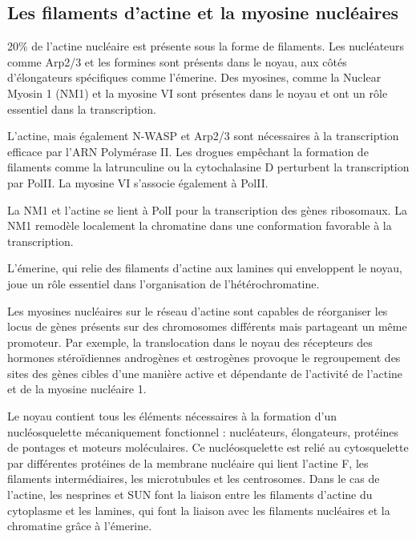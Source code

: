 \subsection{Les filaments d'actine et la myosine nucléaires}

20\% de l'actine nucléaire est présente sous la forme de filaments. Les nucléateurs comme Arp2/3 et les formines sont présents dans le noyau, aux côtés d'élongateurs spécifiques comme l'émerine. 
Des myosines, comme la Nuclear Myosin 1 (NM1) et la myosine VI sont présentes dans le noyau et ont un rôle essentiel dans la transcription. 

L'actine, mais également N-WASP et Arp2/3 sont nécessaires à la transcription efficace par l'ARN Polymérase II. Les drogues empêchant la formation de filaments comme la latrunculine ou la cytochalasine D perturbent la transcription par PolII. La myosine VI s'associe également à PolII. 

La NM1 et l'actine se lient à PolI pour la transcription des gènes ribosomaux. La NM1 remodèle localement la chromatine dans une conformation favorable à la transcription. 

L'émerine, qui relie des filaments d'actine aux lamines qui enveloppent le noyau, joue un rôle essentiel dans l'organisation de l'hétérochromatine. 

Les myosines nucléaires sur le réseau d'actine sont capables de réorganiser les locus de gènes présents sur des chromosomes différents mais partageant un même promoteur. Par exemple, la translocation dans le noyau des récepteurs des hormones stéroïdiennes androgènes et \oe strogènes provoque le regroupement des sites des gènes cibles d'une manière active et dépendante de l'activité de l'actine et de la myosine nucléaire 1. 

Le noyau contient tous les éléments nécessaires à la formation d'un nucléosquelette mécaniquement fonctionnel : nucléateurs, élongateurs, protéines de pontages et moteurs moléculaires. 
Ce nucléosquelette est relié au cytosquelette par différentes protéines de la membrane nucléaire qui lient l'actine F, les filaments intermédiaires, les microtubules et les centrosomes. 
Dans le cas de l'actine, les nesprines et SUN font la liaison entre les filaments d'actine du cytoplasme et les lamines, qui font la liaison avec les filaments nucléaires et la chromatine grâce à l'émerine. 





%
